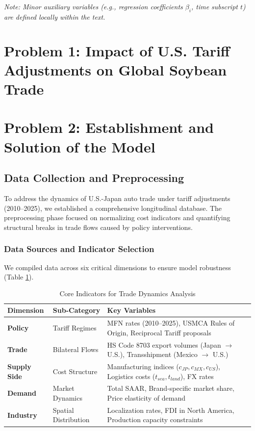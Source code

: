 \documentclass{apmcmthesis}
\begin{document}
\noindent \textit{Note: Minor auxiliary variables (e.g., regression coefficients $\beta_i$, time subscript $t$) are defined locally within the text.}


\section{Problem 1: Impact of U.S. Tariff Adjustments on Global Soybean Trade}



\section{Problem 2: Establishment and Solution of the Model}

\subsection{Data Collection and Preprocessing}
To address the dynamics of U.S.-Japan auto trade under tariff adjustments (2010--2025), we established a comprehensive longitudinal database. The preprocessing phase focused on normalizing cost indicators and quantifying structural breaks in trade flows caused by policy interventions.

\subsubsection{Data Sources and Indicator Selection}
We compiled data across six critical dimensions to ensure model robustness (Table \ref{tab:q2_data_indicators}).

\begin{table}[H]
\centering
\caption{Core Indicators for Trade Dynamics Analysis}
\begin{tabular}{l>{\raggedright\arraybackslash}p{3.5cm}>{\raggedright\arraybackslash}p{7.5cm}}
\toprule
\textbf{Dimension} & \textbf{Sub-Category} & \textbf{Key Variables} \\
\midrule
\textbf{Policy} & Tariff Regimes & MFN rates (2010--2025), USMCA Rules of Origin, Reciprocal Tariff proposals \\
\textbf{Trade} & Bilateral Flows & HS Code 8703 export volumes (Japan $\to$ U.S.), Transshipment (Mexico $\to$ U.S.) \\
\textbf{Supply Side} & Cost Structure & Manufacturing indices ($c_{JP}, c_{MX}, c_{US}$), Logistics costs ($t_{sea}, t_{land}$), FX rates \\
\textbf{Demand} & Market Dynamics & Total SAAR, Brand-specific market share, Price elasticity of demand \\
\textbf{Industry} & Spatial Distribution & Localization rates, FDI in North America, Production capacity constraints \\
\bottomrule
\end{tabular}
\label{tab:q2_data_indicators}
\end{table}
\end{document}
